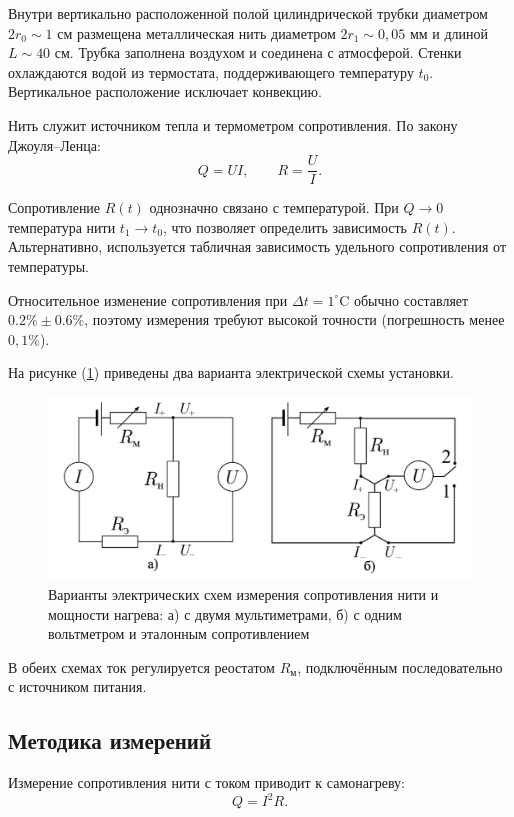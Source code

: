 \documentclass[a4paper,12pt]{article} %
\begin{document}
Внутри вертикально расположенной полой цилиндрической трубки диаметром $2r_0 \sim 1$ см размещена металлическая нить диаметром $2r_1 \sim 0{,}05$ мм и длиной $L \sim 40$ см. Трубка заполнена воздухом и соединена с атмосферой. Стенки охлаждаются водой из термостата, поддерживающего температуру $t_0$. Вертикальное расположение исключает конвекцию.

Нить служит источником тепла и термометром сопротивления. По закону Джоуля–Ленца:
\[
Q = UI, \qquad R = \frac{U}{I}.
\]

Сопротивление $R(t)$ однозначно связано с температурой. При $Q \to 0$ температура нити $t_1 \to t_0$, что позволяет определить зависимость $R(t)$. Альтернативно, используется табличная зависимость удельного сопротивления от температуры.

Относительное изменение сопротивления при $\Delta t = 1^\circ$C обычно составляет $0.2\% \pm 0.6\%$, поэтому измерения требуют высокой точности (погрешность менее $0{,}1\%$).

На рисунке (\ref{fig:curcuit}) приведены два варианта электрической схемы установки.

\begin{figure}[h!]
  \centering
  \includegraphics[scale = 0.5]{curcuit.png}
  \caption{Варианты электрических схем измерения сопротивления нити и мощности нагрева: а) с двумя мультиметрами, б) с одним вольтметром и эталонным сопротивлением}
  \label{fig:curcuit}
\end{figure}

В обеих схемах ток регулируется реостатом $R_\text{м}$, подключённым последовательно с источником питания.

\subsection*{Методика измерений}

Измерение сопротивления нити с током приводит к самонагреву:
\[
Q = I^2 R.
\]
\end{document}
